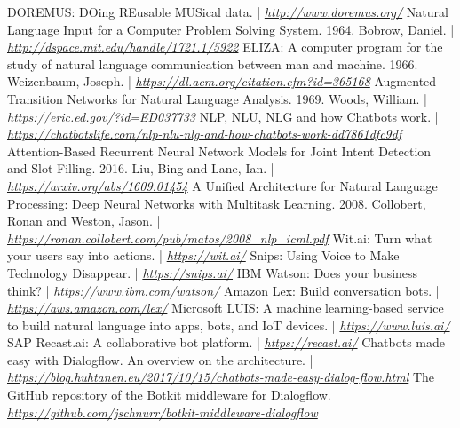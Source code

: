 \documentclass[a4paper,12pt]{report}
\begin{document}
	\begin{thebibliography}{9}
		 DOREMUS: DOing REusable MUSical data. | \textit{\href{http://www.doremus.org/}{http://www.doremus.org/}}
		 Natural Language Input for a Computer Problem Solving System. 1964. Bobrow, Daniel. | \textit{\href{http://dspace.mit.edu/handle/1721.1/5922}{http://dspace.mit.edu/handle/1721.1/5922}}
		 ELIZA: A computer program for the study of natural language communication between man and machine. 1966. Weizenbaum, Joseph. | \textit{\href{https://dl.acm.org/citation.cfm?id=365168}{https://dl.acm.org/citation.cfm?id=365168}}
		 Augmented Transition Networks for Natural Language Analysis. 1969. Woods, William. | \textit{\href{https://eric.ed.gov/?id=ED037733}{https://eric.ed.gov/?id=ED037733}}
		 NLP, NLU, NLG and how Chatbots work. | \textit{\href{https://chatbotslife.com/nlp-nlu-nlg-and-how-chatbots-work-dd7861dfc9df}{https://chatbotslife.com/nlp-nlu-nlg-and-how-chatbots-work-dd7861dfc9df}}
		 Attention-Based Recurrent Neural Network Models for Joint Intent Detection and Slot Filling. 2016. Liu, Bing and Lane, Ian. | \textit{\href{https://arxiv.org/abs/1609.01454}{https://arxiv.org/abs/1609.01454}}
		 A Unified Architecture for Natural Language Processing: Deep Neural Networks with Multitask Learning. 2008. Collobert, Ronan and Weston, Jason. | \textit{\href{https://ronan.collobert.com/pub/matos/2008\_nlp\_icml.pdf}{https://ronan.collobert.com/pub/matos/2008\_nlp\_icml.pdf}}
		 Wit.ai: Turn what your users say into actions. | \textit{\href{https://wit.ai/}{https://wit.ai/}}
		 Snips: Using Voice to Make Technology Disappear. | \textit{\href{https://snips.ai/}{https://snips.ai/}}
		 IBM Watson: Does your business think? | \textit{\href{https://www.ibm.com/watson/}{https://www.ibm.com/watson/}}
		 Amazon Lex: Build conversation bots. | \textit{\href{https://aws.amazon.com/lex/}{https://aws.amazon.com/lex/}}
		 Microsoft LUIS: A machine learning-based service to build natural language into apps, bots, and IoT devices. | \textit{\href{https://www.luis.ai/}{https://www.luis.ai/}}
		 SAP Recast.ai: A collaborative bot platform. | \textit{\href{https://recast.ai/}{https://recast.ai/}}
		 Chatbots made easy with Dialogflow. An overview on the architecture. | \textit{\href{https://blog.huhtanen.eu/2017/10/15/chatbots-made-easy-dialog-flow.html}{https://blog.huhtanen.eu/2017/10/15/chatbots-made-easy-dialog-flow.html}}
		 The GitHub repository of the Botkit middleware for Dialogflow. | \textit{\href{https://github.com/jschnurr/botkit-middleware-dialogflow}{https://github.com/jschnurr/botkit-middleware-dialogflow}}
	\end{thebibliography}
\end{document}
